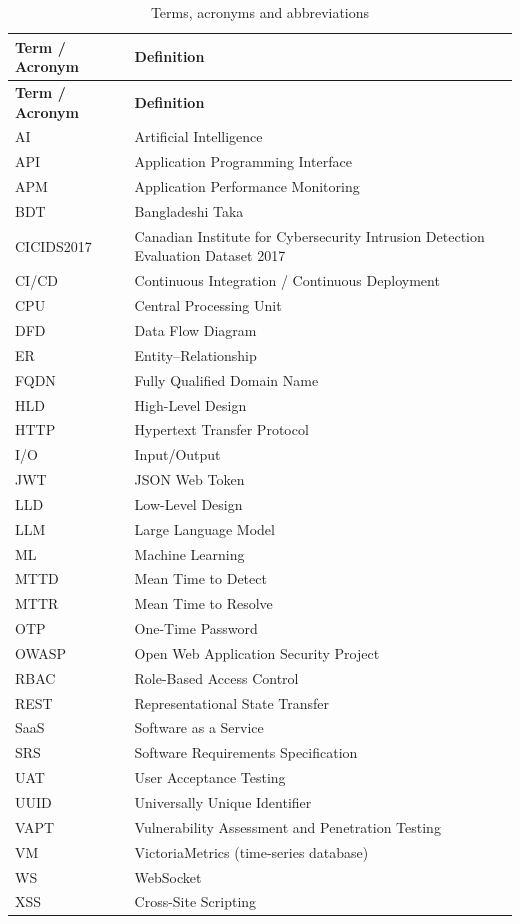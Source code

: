 \begin{longtable}{@{}p{} p{}@{}}
\caption{Terms, acronyms and abbreviations}\label{tab:terms}\\
\toprule
\textbf{Term / Acronym} & \textbf{Definition}\\
\midrule
\endfirsthead
\toprule
\textbf{Term / Acronym} & \textbf{Definition}\\
\midrule
\endhead
AI    & Artificial Intelligence\\
API   & Application Programming Interface\\
APM   & Application Performance Monitoring\\
BDT   & Bangladeshi Taka\\
CICIDS2017 & Canadian Institute for Cybersecurity Intrusion Detection Evaluation Dataset 2017\\
CI/CD & Continuous Integration / Continuous Deployment\\
CPU   & Central Processing Unit\\
DFD   & Data Flow Diagram\\
ER    & Entity--Relationship\\
FQDN  & Fully Qualified Domain Name\\
HLD   & High-Level Design\\
HTTP  & Hypertext Transfer Protocol\\
I/O   & Input/Output\\
JWT   & JSON Web Token\\
LLD   & Low-Level Design\\
LLM   & Large Language Model\\
ML    & Machine Learning\\
MTTD  & Mean Time to Detect\\
MTTR  & Mean Time to Resolve\\
OTP   & One-Time Password\\
OWASP & Open Web Application Security Project\\
RBAC  & Role-Based Access Control\\
REST  & Representational State Transfer\\
SaaS  & Software as a Service\\
SRS   & Software Requirements Specification\\
UAT   & User Acceptance Testing\\
UUID  & Universally Unique Identifier\\
VAPT  & Vulnerability Assessment and Penetration Testing\\
VM    & VictoriaMetrics (time-series database)\\
WS    & WebSocket\\
XSS   & Cross-Site Scripting\\
\bottomrule
\end{longtable}

